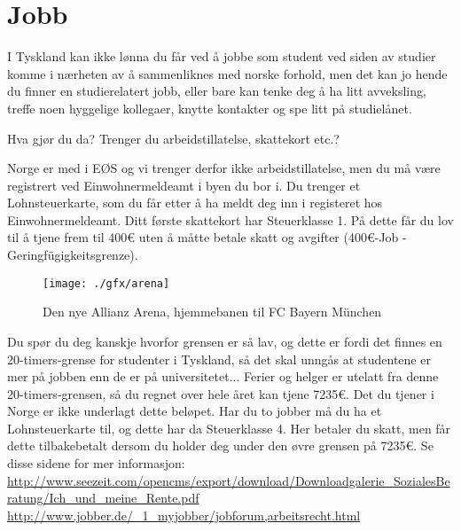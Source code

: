 \chapter{Jobb}

I Tyskland kan ikke lønna du får ved å jobbe som student ved siden av studier komme i nærheten av å sammenliknes med norske forhold, men det kan jo hende du finner en studierelatert jobb, eller bare kan tenke deg å ha litt avveksling, treffe noen hyggelige kollegaer, knytte kontakter og spe litt på studielånet.

Hva gjør du da? Trenger du arbeidstillatelse, skattekort etc.?

Norge er med i EØS og vi trenger derfor ikke arbeidstillatelse, men du må være registrert ved Einwohnermeldeamt i byen du bor i.
Du trenger et Lohnsteuerkarte, som du får etter å ha meldt deg inn i registeret hos Einwohnermeldeamt. Ditt første skattekort har Steuerklasse 1. På dette får du lov til å tjene frem til 400\euro{} uten å måtte betale skatt og avgifter (400\euro{}-Job - Geringfügigkeitsgrenze).


\begin{figure}[h]
\center
\texttt{[image: ./gfx/arena]}
\caption{Den nye Allianz Arena, hjemmebanen til FC Bayern München}
\end{figure}

Du spør du deg kanskje hvorfor grensen er så lav, og dette er fordi det finnes en 20-timers-grense for studenter i Tyskland, så det skal unngås at studentene er mer på jobben enn de er på universitetet... Ferier og helger er utelatt fra denne 20-timers-grensen, så du regnet over hele året kan tjene 7235\euro{}. Det du tjener i Norge er ikke underlagt dette beløpet.
Har du to jobber må du ha et Lohnsteuerkarte til, og dette har da Steuerklasse 4. Her betaler du skatt, men får dette tilbakebetalt dersom du holder deg under den øvre grensen på 7235\euro{}.
Se disse sidene for mer informasjon: \\
\url{http://www.seezeit.com/opencms/export/download/Downloadgalerie_SozialesBeratung/Ich_und_meine_Rente.pdf} \\
\url{http://www.jobber.de/_1_myjobber/jobforum,arbeitsrecht.html}
